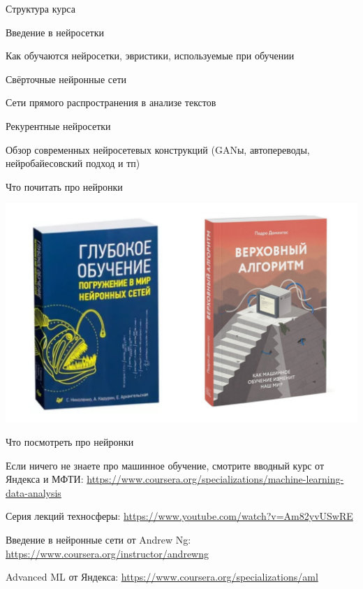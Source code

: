 \documentclass[notes,12pt, aspectratio=169]{beamer}
\newenvironment{wideitemize}{\itemize\addtolength{\itemsep}{10pt}}{\enditemize}
\begin{document}
\begin{frame}{Структура курса}
\begin{wideitemize}
	
	\item Введение в нейросетки
	
	\item Как обучаются нейросетки, эвристики, используемые при обучении
	
	\item Свёрточные нейронные сети
	
	\item Сети прямого распространения в анализе текстов
	
	\item Рекурентные нейросетки 
	
	\item Обзор современных нейросетевых конструкций (GANы, автопереводы, нейробайесовский подход и тп)
\end{wideitemize} 
\end{frame}


\begin{frame}{Что почитать про нейронки}
\begin{center}
	\includegraphics[width=.8\linewidth]{books.png}
\end{center}
\end{frame} 


\begin{frame}{Что посмотреть  про нейронки}
\begin{wideitemize} 
\item Если ничего не знаете про машинное обучение, смотрите вводный курс от Яндекса и МФТИ: {\color{blue} \url{https://www.coursera.org/specializations/machine-learning-data-analysis}}

\item Серия лекций техносферы: {\color{blue} \url{https://www.youtube.com/watch?v=Am82yvUSwRE}}

\item  Введение в нейронные сети от Andrew Ng: {\color{blue} \url{https://www.coursera.org/instructor/andrewng}}

\item  Advanced ML от Яндекса: {\color{blue} \url{https://www.coursera.org/specializations/aml}}

\end{wideitemize} 
\end{frame} 
\end{document}
